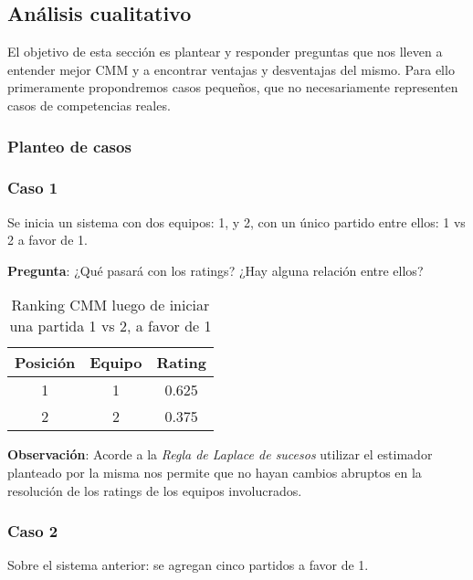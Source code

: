 \subsection{Análisis cualitativo}

El objetivo de esta sección es plantear y responder preguntas que nos lleven a entender mejor CMM y a encontrar ventajas y desventajas del mismo. Para ello primeramente propondremos casos pequeños, que no necesariamente representen casos de competencias reales.

\subsubsection{Planteo de casos}

\subsubsection*{Caso 1}
Se inicia un sistema con dos equipos: 1, y 2, con un único partido entre ellos: 1 vs 2 a favor de 1.

\textbf{Pregunta}: ¿Qué pasará con los ratings? ¿Hay alguna relación entre ellos?

\begin{table}[h!]
    \begin{center}
        \begin{tabular}{|c|c|c|}
        \hline
        \textbf{Posición} & \textbf{Equipo} & \textbf{Rating} \\
        \hline
        1 & 1 & 0.625\\
        2 & 2 & 0.375\\
        \hline
        \end{tabular}
        \caption{Ranking CMM luego de iniciar una partida 1 vs 2, a favor de 1}
        \label{cmm_caso_1}
    \end{center}
\end{table}

\textbf{Observación}: Acorde a la \textit{Regla de Laplace de sucesos} utilizar el estimador planteado por la misma nos permite que no hayan cambios abruptos en la resolución de los ratings de los equipos involucrados.

\subsubsection*{Caso 2}

Sobre el sistema anterior: se agregan cinco partidos a favor de 1.

